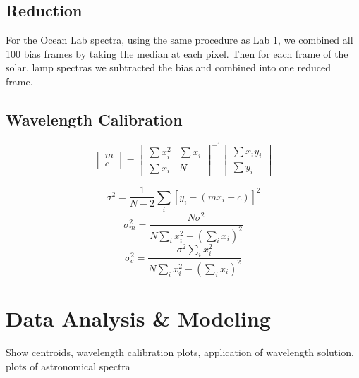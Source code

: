 \documentclass[preprint]{aastex62}
\begin{document}
\subsection{Reduction}
For the Ocean Lab spectra, using the same procedure as Lab 1, we combined all 100 bias frames by taking the median at each pixel. Then for each frame of the solar, lamp spectras we subtracted the bias and combined into one reduced frame.



\subsection{Wavelength Calibration}

\begin{equation}
\begin{bmatrix}
    m \\ c
\end{bmatrix}
= 
\begin{bmatrix}
    \sum x_i^2 & \sum x_i \\
    \sum x_i & N
\end{bmatrix}^{-1}
\begin{bmatrix}
    \sum x_i y_i \\ \sum y_i
\end{bmatrix}
\end{equation}

\begin{equation}
    \sigma^2 = \frac{1}{N-2}\sum_i [y_i - (mx_i + c)]^2
\end{equation}
\begin{equation}
    \sigma_m^2 = \frac{N\sigma^2}{N\sum_i x_i^2 - \left(\sum_i x_i \right)^2}
\end{equation}
\begin{equation}
    \sigma_c^2 = \frac{\sigma^2 \sum_i x_i^2}{N\sum_i x_i^2 - \left(\sum_i x_i \right)^2}
\end{equation}


\section{Data Analysis \& Modeling} \label{sec:analysis}
Show centroids, wavelength calibration plots, application of wavelength solution, plots of astronomical spectra
\end{document}
